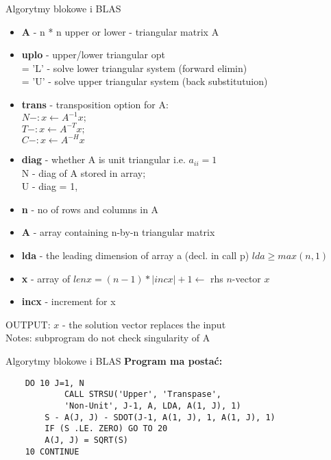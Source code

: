	\begin{frame}[allowframebreaks]{Algorytmy blokowe i BLAS}
	\begin{itemize}
	\item \textbf{A} - n * n upper or lower - triangular matrix A \\
	\item \textbf{uplo} - upper/lower triangular opt \\
	= 'L' - solve lower triangular system (forward elimin) \\
	= 'U' - solve upper triangular system (back substitutuion) \\
	\item \textbf{trans} - transposition option for A: \\
	$N - : x \leftarrow A^{-1} x;$ \\
	$T - : x \leftarrow A^{-T} x;$ \\
	$C - : x \leftarrow A^{-H} x$ \\
	\item \textbf{diag} - whether A is unit triangular i.e. $a_{ii} = 1$ \\
	N - diag of A stored in array; \\
	U - diag = 1, \\
	\item \textbf{n} - no of rows and columns in A \\
	\item \textbf{A} - array containing n-by-n triangular matrix \\
	\item \textbf{lda} - the leading dimension of array a (decl. in call p) $lda \geq max(n, 1)$ \\ 
	\item \textbf{x} - array of $lenx = (n - 1) *  |incx| + 1 \leftarrow$ rhs $n$-vector $x$ \\
	\item \textbf{incx} - increment for x \\ 
	\end{itemize}
	OUTPUT:  $x$ - the solution vector replaces the input \\
	Notes: subprogram do not check singularity of A \\
	\end{frame}

\begin{frame}[fragile]{Algorytmy blokowe i BLAS}
		\textbf{Program ma postać:}
		\begin{lstlisting}
    DO 10 J=1, N
            CALL STRSU('Upper', 'Transpase', 
            'Non-Unit', J-1, A, LDA, A(1, J), 1)
        S - A(J, J) - SDOT(J-1, A(1, J), 1, A(1, J), 1)
        IF (S .LE. ZERO) GO TO 20
        A(J, J) = SQRT(S)
    10 CONTINUE
		\end{lstlisting}
		
\end{frame}

